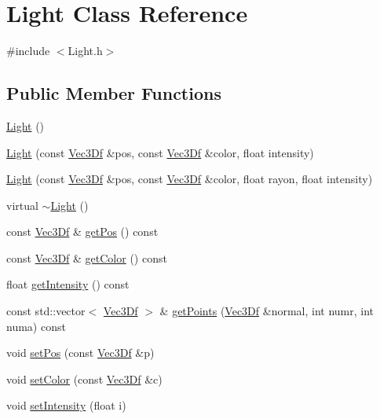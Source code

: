 \hypertarget{class_light}{
\section{Light Class Reference}
\label{class_light}
}


{\ttfamily \#include $<$Light.h$>$}

\subsection*{Public Member Functions}
\begin{DoxyCompactItemize}
\item 
\hyperlink{class_light_aeb5df09a25a32f19fdffa761268ba24f}{Light} ()
\item 
\hyperlink{class_light_a5a9290bfca6e7f8909a18735dcc9da37}{Light} (const \hyperlink{class_vec3_d}{Vec3Df} \&pos, const \hyperlink{class_vec3_d}{Vec3Df} \&color, float intensity)
\item 
\hyperlink{class_light_ae258a834c1c4edb240533cbab46acfaf}{Light} (const \hyperlink{class_vec3_d}{Vec3Df} \&pos, const \hyperlink{class_vec3_d}{Vec3Df} \&color, float rayon, float intensity)
\item 
virtual \hyperlink{class_light_abe675054027c4b4a4f3e9a31d330931f}{$\sim$Light} ()
\item 
const \hyperlink{class_vec3_d}{Vec3Df} \& \hyperlink{class_light_a4df5adb9ce0b7766af839bda72d86d84}{getPos} () const 
\item 
const \hyperlink{class_vec3_d}{Vec3Df} \& \hyperlink{class_light_aa2c88eb97bbda607b4ecf0b718f57d5a}{getColor} () const 
\item 
float \hyperlink{class_light_ab0d1f1347856b81a7a4dba0a6833cc3c}{getIntensity} () const 
\item 
const std::vector$<$ \hyperlink{class_vec3_d}{Vec3Df} $>$ \& \hyperlink{class_light_a3c06b2ce14feed5b77d7a56e22109bcc}{getPoints} (\hyperlink{class_vec3_d}{Vec3Df} \&normal, int numr, int numa) const 
\item 
void \hyperlink{class_light_a148f99cba1ccf7a13dbe65273a090710}{setPos} (const \hyperlink{class_vec3_d}{Vec3Df} \&p)
\item 
void \hyperlink{class_light_ac4d6006127c6b7a36a6533650b2e5f38}{setColor} (const \hyperlink{class_vec3_d}{Vec3Df} \&c)
\item 
void \hyperlink{class_light_a5ab256c92798821097c687d8bfc95a40}{setIntensity} (float i)
\end{DoxyCompactItemize}


